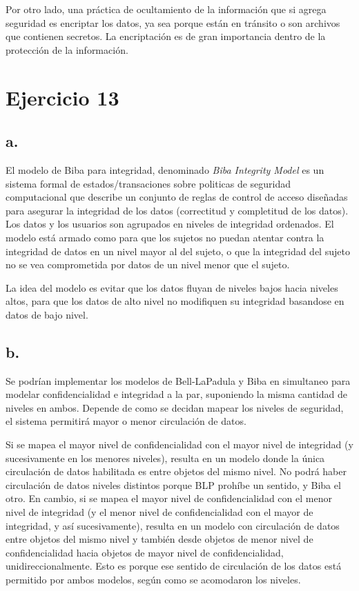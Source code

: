 \documentclass[11pt]{article}
\begin{document}
Por otro lado, una práctica de ocultamiento de la información que si agrega seguridad es encriptar los 
datos, ya sea porque están en tránsito o son archivos que contienen secretos. La encriptación es de 
gran importancia dentro de la protección de la información.
 

\section*{Ejercicio 13}
\subsection*{a.}
El modelo de Biba para integridad, denominado \textit{Biba Integrity Model} es un sistema formal de 
estados/transaciones sobre politicas de seguridad computacional que describe un conjunto de reglas 
de control de acceso diseñadas para asegurar la integridad de los datos (correctitud y completitud 
de los datos). Los datos y los usuarios son agrupados en niveles de integridad ordenados. El modelo 
está armado como para que los sujetos no puedan atentar contra la integridad de datos en un nivel 
mayor al del sujeto, o que la integridad del sujeto no se vea comprometida por datos de un nivel 
menor que el sujeto.

La idea del modelo es evitar que los datos fluyan de niveles bajos hacia niveles altos, para que los
datos de alto nivel no modifiquen su integridad basandose en datos de bajo nivel. 

\subsection*{b.}
Se podrían implementar los modelos de Bell-LaPadula y Biba en simultaneo para modelar confidencialidad 
e integridad a la par, suponiendo la misma cantidad de niveles en ambos. Depende de como se decidan 
mapear los niveles de seguridad, el sistema permitirá mayor o menor circulación de datos. 

Si se mapea el mayor nivel de confidencialidad con el mayor nivel de integridad (y sucesivamente en 
los menores niveles), resulta en un modelo donde la única circulación de datos habilitada es entre 
objetos del mismo nivel. No podrá haber circulación de datos niveles distintos porque BLP prohíbe un 
sentido, y Biba el otro. En cambio, si se mapea el mayor nivel de confidencialidad con el menor nivel 
de integridad (y el menor nivel de confidencialidad con el mayor de integridad, y así sucesivamente), 
resulta en un modelo con circulación de datos entre objetos del mismo nivel y también desde objetos 
de menor nivel de confidencialidad hacia objetos de mayor nivel de confidencialidad, unidireccionalmente. 
Esto es porque ese sentido de circulación de los datos está permitido por ambos modelos, según como se 
acomodaron los niveles.
\end{document}
